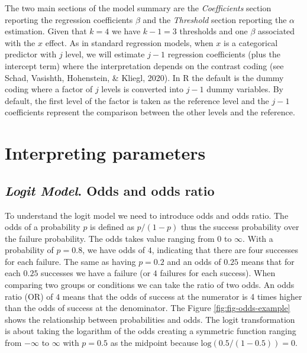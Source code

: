 \documentclass[
  man,floatsintext]{apa6}
\begin{document}
\normalsize

The two main sections of the model summary are the \emph{Coefficients} section reporting the regression coefficients \(\beta\) and the \emph{Threshold} section reporting the \(\alpha\) estimation. Given that \(k = 4\) we have \(k - 1 = 3\) thresholds and one \(\beta\) associated with the \(x\) effect. As in standard regression models, when \(x\) is a categorical predictor with \(j\) level, we will estimate \(j - 1\) regression coefficients (plus the intercept term) where the interpretation depends on the contrast coding (see Schad, Vasishth, Hohenstein, \& Kliegl, 2020). In R the default is the dummy coding where a factor of \(j\) levels is converted into \(j - 1\) dummy variables. By default, the first level of the factor is taken as the reference level and the \(j - 1\) coefficients represent the comparison between the other levels and the reference.

\section{Interpreting parameters}\label{interpreting-parameters}

\subsection{\texorpdfstring{\emph{Logit Model}. Odds and odds ratio}{Logit Model. Odds and odds ratio}}\label{logit-model.-odds-and-odds-ratio}

To understand the logit model we need to introduce odds and odds ratio. The odds of a probability \(p\) is defined as \(p/(1 - p)\) thus the success probability over the failure probability. The odds takes value ranging from \(0\) to \(\infty\). With a probability of \(p = 0.8\), we have odds of \(4\), indicating that there are four successes for each failure. The same as having \(p = 0.2\) and an odds of \(0.25\) means that for each \(0.25\) successes we have a failure (or \(4\) failures for each success). When comparing two groups or conditions we can take the ratio of two odds. An odds ratio (OR) of \(4\) means that the odds of success at the numerator is 4 times higher than the odds of success at the denominator. The Figure \ref{fig:fig-odds-example} shows the relationship between probabilities and odds. The logit transformation is about taking the logarithm of the odds creating a symmetric function ranging from \(-\infty\) to \(\infty\) with \(p = 0.5\) as the midpoint because \(\text{log}(0.5/(1 - 0.5)) = 0\).
\end{document}
